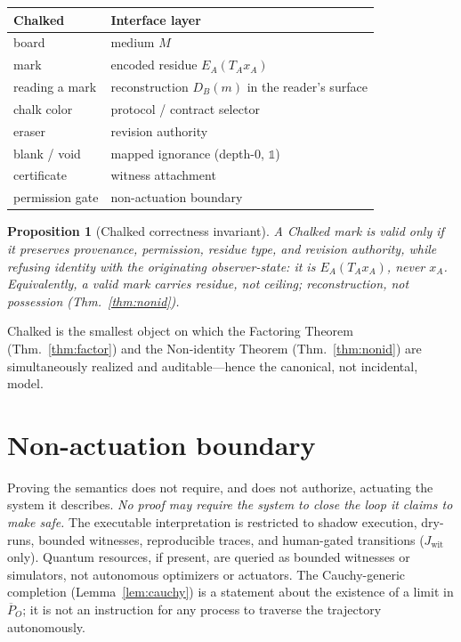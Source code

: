 \documentclass[11pt]{article}
\newtheorem{proposition}{Proposition}
\theoremstyle{definition}
\theoremstyle{remark}
\newcommand{\Jwit}{J_{\mathrm{wit}}}
\begin{document}
\begin{center}
\renewcommand{\arraystretch}{1.2}
\begin{tabular}{@{}p{} p{}@{}}
\toprule
\textbf{Chalked} & \textbf{Interface layer} \\
\midrule
board & medium $M$ \\
mark & encoded residue $E_A(T_Ax_A)$ \\
reading a mark & reconstruction $D_B(m)$ in the reader's surface \\
chalk color & protocol / contract selector \\
eraser & revision authority \\
blank / void & mapped ignorance (depth-$0$, $\mathbb{1}$) \\
certificate & witness attachment \\
permission gate & non-actuation boundary \\
\bottomrule
\end{tabular}
\end{center}

\begin{proposition}[Chalked correctness invariant]\label{prop:chalked}
A Chalked mark is valid only if it preserves provenance, permission, residue type, and revision
authority, while refusing identity with the originating observer-state: it is $E_A(T_Ax_A)$, never
$x_A$. Equivalently, \emph{a valid mark carries residue, not ceiling; reconstruction, not possession}
(Thm.~\ref{thm:nonid}).
\end{proposition}

Chalked is the smallest object on which the Factoring Theorem (Thm.~\ref{thm:factor}) and the
Non-identity Theorem (Thm.~\ref{thm:nonid}) are simultaneously realized and auditable---hence the
canonical, not incidental, model.

\section{Non-actuation boundary}

Proving the semantics does not require, and does not authorize, actuating the system it describes.
\emph{No proof may require the system to close the loop it claims to make safe.} The executable
interpretation is restricted to shadow execution, dry-runs, bounded witnesses, reproducible traces,
and human-gated transitions ($\Jwit$ only). Quantum resources, if present, are queried as bounded
witnesses or simulators, not autonomous optimizers or actuators. The Cauchy-generic completion
(Lemma~\ref{lem:cauchy}) is a statement about the existence of a limit in $\overline{P}_O$; it is not
an instruction for any process to traverse the trajectory autonomously.
\end{document}
